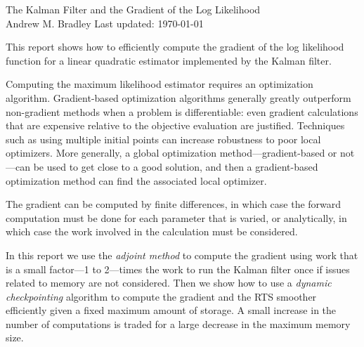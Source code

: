 \documentclass[10pt,fleqn]{article}
\begin{document}
\sloppy
\begin{center}
{\large The Kalman Filter and the Gradient of the Log Likelihood} \\
Andrew M. Bradley \quad  \quad Last updated: \today
\end{center}


\noindent This report shows how to efficiently compute the gradient of the log
likelihood function for a linear quadratic estimator implemented by the Kalman
filter.

Computing the maximum likelihood estimator requires an optimization
algorithm. Gradient-based optimization algorithms generally greatly outperform
non-gradient methods when a problem is differentiable: even gradient
calculations that are expensive relative to the objective evaluation are
justified. Techniques such as using multiple initial points can increase
robustness to poor local optimizers. More generally, a global optimization
method---gradient-based or not---can be used to get close to a good solution,
and then a gradient-based optimization method can find the associated local
optimizer.

The gradient can be computed by finite differences, in which case
the forward computation must be done for each parameter that is varied, or
analytically, in which case the work involved in the calculation must be
considered.

In this report we use the \emph{adjoint method} to compute the gradient using
work that is a small factor---1 to 2---times the work to run the Kalman filter
once if issues related to memory are not considered. Then we show how to use a
\emph{dynamic checkpointing} algorithm to compute the gradient and the RTS
smoother efficiently given a fixed maximum amount of storage. A small increase
in the number of computations is traded for a large decrease in the maximum
memory size.
\end{document}
